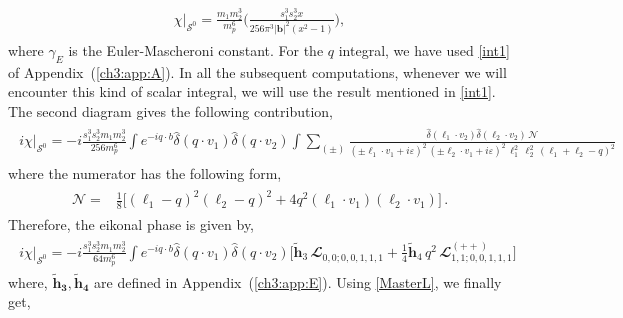 \begin{align}
    \begin{split} \label{eq1}
\chi\Big|_{\mathcal{S}^0}=\frac{ m_1 m_2^3}{m_p^6}\Bigg(\frac{s_1^3 s_2^3 x}{256 \pi ^3 |\boldsymbol{b}|^2 \left(x^2-1\right)}\Bigg) ,
    \end{split}
\end{align}
where $\gamma_E$ is the Euler-Mascheroni constant. For the $q$ integral, we have used \eqref{int1} of Appendix~(\ref{ch3:app:A}). In all the subsequent computations, whenever we will encounter this kind of scalar integral, we will use the result mentioned in \eqref{int1}.
The second diagram gives the following contribution,
\begin{align}
    \begin{split}
      i\chi\Big|_{\mathcal{S}^0}=-i \frac{s_1^3 s_2^3 m_1 m_2^3}{256 m_p^6} \int e^{-iq\cdot b}\hat\delta(q\cdot v_1)\hat\delta(q\cdot v_2)\int \sum_{(\pm)}\frac{\hat\delta(\ell_1\cdot v_2)\hat\delta(\ell_2\cdot v_2)\,\mathcal{N}}{(\pm\ell_1\cdot v_1+i\varepsilon)^2\,(\pm\ell_2\cdot v_1+i\varepsilon)^2\,\ell_1^2\,\ell_2^2\,(\ell_1+
        \ell_2-q)^2}
    \end{split}
\end{align}
where the numerator has the following form,
\begin{align}
    \begin{split}
        \mathcal{N}=&\frac{1}{8}\Bigg[(\ell_1-q)^2(\ell_2-q)^2+4q^2 (\ell_1\cdot v_1)(\ell_2\cdot v_1)\Bigg]\,.
    \end{split}
\end{align}
Therefore, the eikonal phase is given by,
\begin{align}
    \begin{split} 
    i\chi\Big|_{\mathcal{S}^0}=-i \frac{s_1^3 s_2^3 m_1 m_2^3}{64 m_p^6}\int e^{-iq\cdot b}\hat\delta(q\cdot v_1)\hat\delta(q\cdot v_2)\Bigg[\boldsymbol{\tilde h}_3\,\mathbfcal{L}_{0,0;0,0,1,1,1}+\frac{1}{4}\boldsymbol{\tilde h}_4\,q^2\,\mathbfcal{L}^{(++)}_{1,1;0,0,1,1,1}\Bigg]
    \end{split}
\end{align}
where, $ \boldsymbol{\tilde h_3},  \boldsymbol{\tilde h_4}$ are defined in Appendix~(\ref{ch3:app:E}).
Using \eqref{MasterL}, we finally get,

